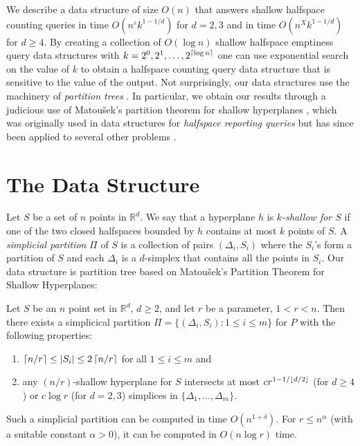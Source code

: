 \documentclass[lotsofwhite]{patmorin}
\newcommand{\eps}{\varepsilon}
\begin{document}
We describe a data structure of size $O(n)$ that answers shallow
halfspace counting queries in time $O(n^\eps k^{1-1/d})$ for $d=2,3$
and in time $O(n^{X}k^{1-1/d})$ for $d\ge 4$.  By creating a
collection of $O(\log n)$ shallow halfspace emptiness query data
structures with $k=2^0,2^1,\ldots,2^{\left\lceil \log n \right\rceil}$ one can use
exponential search on the value of $k$ to obtain a halfspace counting
query data structure that is sensitive to the value of the output.
Not surprisingly, our data structures use the machinery of
\emph{partition trees} \cite{many-matouseks,welzl}.  In particular, we
obtain our results through a judicious use of Matou\v{s}ek's partition
theorem for shallow hyperplanes \cite{matousek-shallow}, which was
originally used in data structures for \emph{halfspace reporting
queries} but has since been applied to several other problems
\cite{ramos,chan1,chan2}.

\section{The Data Structure}


Let $S$ be a set of $n$ points in $\mathbb{R}^d$.  We say that a
hyperplane $h$ is \emph{$k$-shallow for $S$} if one of the two closed
halfspaces bounded by $h$ contains at most $k$ points of $S$.   A
\emph{simplicial partition} $\Pi$ of $S$ is a collection of pairs
$(\Delta_i,S_i)$ where the $S_i$'s form a partition of $S$ and each
$\Delta_i$ is a $d$-simplex that contains all the points in $S_i$.
Our data structure is partition tree based on Matou\v{s}ek's Partition
Theorem for Shallow Hyperplanes:

\begin{thm}[Matou\v{s}ek 1992]
Let $S$ be an $n$ point set in $\mathbb{R}^d$, $d\ge 2$, and let $r$
be a parameter, $1<r<n$.  Then there exists a simplicical partition
$\Pi=\{(\Delta_i,S_i):1\le i\le m\}$ for $P$ with the following
properties:
\begin{enumerate}
\item $\left\lceil n/r \right\rceil\le |S_i|\le 2\left\lceil n/r \right\rceil$ for all $1\le i\le m$ and 

\item any $(n/r)$-shallow hyperplane for $S$ intersects at most
$cr^{1-1/\left\lfloor d/2 \right\rfloor}$ (for $d\ge 4$) or $c\log r$ (for
$d=2,3$) simplices in $\{\Delta_1,\ldots,\Delta_m\}$.
\end{enumerate}
Such a simplicial partition can be computed in time $O(n^{1+\delta})$.
For $r\le n^\alpha$ (with a suitable constant $\alpha > 0$), it can be
computed in $O(n\log r)$ time.
\end{thm}
\end{document}
